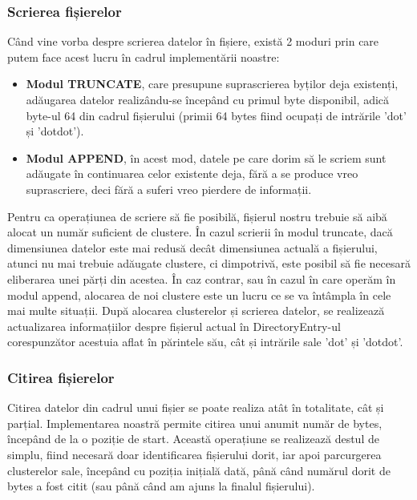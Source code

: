 \subsubsection{Scrierea fișierelor}

Când vine vorba despre scrierea datelor în fișiere, există 2 moduri prin care putem face acest lucru în cadrul implementării noastre:

\begin{itemize}
  \item \textbf{Modul TRUNCATE}, care presupune suprascrierea byților deja existenți, adăugarea datelor realizându-se începând cu primul byte disponibil, adică byte-ul 64 din cadrul fișierului (primii 64 bytes fiind ocupați de intrările 'dot' și 'dotdot').

  \item \textbf{Modul APPEND}, în acest mod, datele pe care dorim să le scriem sunt adăugate în continuarea celor existente deja, fără a se produce vreo suprascriere, deci fără a suferi vreo pierdere de informații.
\end{itemize}

Pentru ca operațiunea de scriere să fie posibilă, fișierul nostru trebuie să aibă alocat un număr suficient de clustere. În cazul scrierii în modul truncate, dacă dimensiunea datelor este mai redusă decât dimensiunea actuală a fișierului, atunci nu mai trebuie adăugate clustere, ci dimpotrivă, este posibil să fie necesară eliberarea unei părți din acestea. În caz contrar, sau în cazul în care operăm în modul append, alocarea de noi clustere este un lucru ce se va întâmpla în cele mai multe situații. După alocarea clusterelor și scrierea datelor, se realizează actualizarea informațiilor despre fișierul actual în DirectoryEntry-ul corespunzător acestuia aflat în părintele său, cât și intrările sale 'dot' și 'dotdot'.


\subsubsection{Citirea fișierelor}

Citirea datelor din cadrul unui fișier se poate realiza atât în totalitate, cât și parțial. Implementarea noastră permite citirea unui anumit număr de bytes, începând de la o poziție de start. Această operațiune se realizează destul de simplu, fiind necesară doar identificarea fișierului dorit, iar apoi parcurgerea clusterelor sale, începând cu poziția inițială dată, până când numărul dorit de bytes a fost citit (sau până când am ajuns la finalul fișierului).


